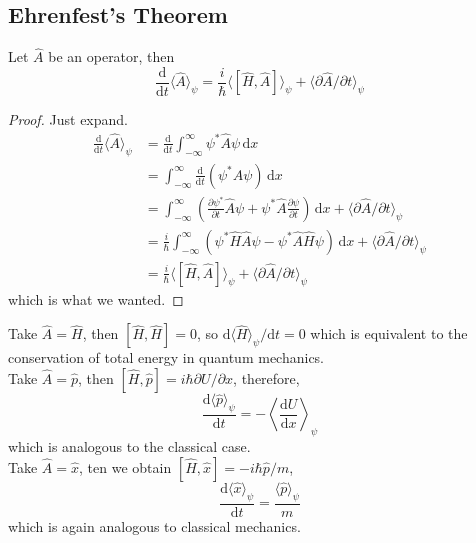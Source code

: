 \subsection{Ehrenfest's Theorem}
\begin{theorem}
    Let $\hat{A}$ be an operator, then
    $$\frac{\mathrm d}{\mathrm dt}\langle\hat{A}\rangle_\psi=\frac{i}{\hbar}\langle [\hat{H},\hat{A}]\rangle_\psi+\langle\partial\hat{A}/\partial t\rangle_\psi$$
\end{theorem}
\begin{proof}
    Just expand.
    \begin{align*}
        \frac{\mathrm d}{\mathrm dt}\langle\hat{A}\rangle_\psi&=\frac{\mathrm d}{\mathrm dt}\int_{-\infty}^\infty\psi^*\hat{A}\psi\,\mathrm dx\\
        &=\int_{-\infty}^\infty\frac{\mathrm d}{\mathrm dt}(\psi^*\hat{A}\psi)\,\mathrm dx\\
        &=\int_{-\infty}^\infty \left( \frac{\partial\psi^*}{\partial t}\hat{A}\psi+\psi^*\hat{A}\frac{\partial\psi}{\partial t} \right)\,\mathrm dx+\langle\partial\hat{A}/\partial t\rangle_\psi\\
        &=\frac{i}{\hbar}\int_{-\infty}^\infty (\psi^*\hat{H}\hat{A}\psi-\psi^*\hat{A}\hat{H}\psi)\,\mathrm dx+\langle\partial\hat{A}/\partial t\rangle_\psi\\
        &=\frac{i}{\hbar}\langle[\hat{H},\hat{A}]\rangle_\psi+\langle\partial\hat{A}/\partial t\rangle_\psi
    \end{align*}
    which is what we wanted.
\end{proof}
\begin{example}
    Take $\hat{A}=\hat{H}$, then $[\hat{H},\hat{H}]=0$, so $\mathrm d\langle\hat{H}\rangle_\psi/\mathrm dt=0$ which is equivalent to the conservation of total energy in quantum mechanics.\\
    Take $\hat{A}=\hat{p}$, then $[\hat{H},\hat{p}]=i\hbar\partial U/\partial x$, therefore,
    $$\frac{\mathrm d\langle\hat{p}\rangle_\psi}{\mathrm dt}=-\left\langle\frac{\mathrm dU}{\mathrm dx}\right\rangle_\psi$$
    which is analogous to the classical case.\\
    Take $\hat{A}=\hat{x}$, ten we obtain $[\hat{H},\hat{x}]=-i\hbar\hat{p}/m$,
    $$\frac{\mathrm d\langle\hat{x}\rangle_\psi}{\mathrm dt}=\frac{\langle\hat{p}\rangle_\psi}{m}$$
    which is again analogous to classical mechanics.
\end{example}
